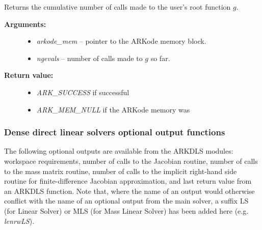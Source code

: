 \documentclass[letterpaper,10pt,english]{sphinxmanual}
\begin{document}
\begin{fulllineitems}
\label{c_interface/User_callable:ARKodeGetNumGEvals}
Returns the cumulative number of calls made to the
user's root function $g$.
\begin{description}
\item[{\textbf{Arguments:}}] \leavevmode\begin{itemize}
\item {} 
\emph{arkode\_mem} -- pointer to the ARKode memory block.

\item {} 
\emph{ngevals} -- number of calls made to $g$ so far.

\end{itemize}

\item[{\textbf{Return value:}}] \leavevmode\begin{itemize}
\item {} 
\emph{ARK\_SUCCESS} if successful

\item {} 
\emph{ARK\_MEM\_NULL} if the ARKode memory was 

\end{itemize}

\end{description}

\end{fulllineitems}



\subsubsection{Dense direct linear solvers optional output functions}
\label{c_interface/User_callable:cinterface-arkdlsoutputs}\label{c_interface/User_callable:dense-direct-linear-solvers-optional-output-functions}
The following optional outputs are available from the ARKDLS
modules: workspace requirements, number of calls to the Jacobian
routine, number of calls to the mass matrix routine, number of calls
to the implicit right-hand side routine for finite-difference Jacobian
approximation, and last return value from an ARKDLS function.  Note
that, where the name of an output would otherwise conflict with the
name of an optional output from the main solver, a suffix LS (for
Linear Solver) or MLS (for Mass Linear Solver) has been added here
(e.g. \emph{lenrwLS}).
\end{document}
